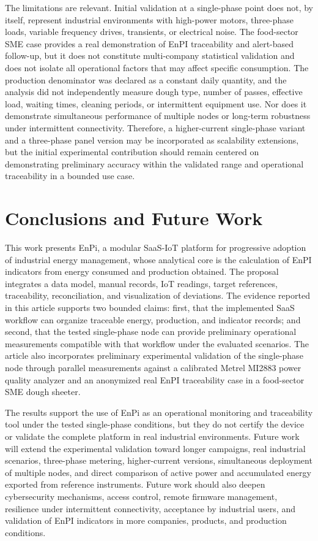 \documentclass{ieeeaccess}
\begin{document}
The limitations are relevant. Initial validation at a single-phase point does not, by itself, represent industrial environments with high-power motors, three-phase loads, variable frequency drives, transients, or electrical noise. The food-sector SME case provides a real demonstration of EnPI traceability and alert-based follow-up, but it does not constitute multi-company statistical validation and does not isolate all operational factors that may affect specific consumption. The production denominator was declared as a constant daily quantity, and the analysis did not independently measure dough type, number of passes, effective load, waiting times, cleaning periods, or intermittent equipment use. Nor does it demonstrate simultaneous performance of multiple nodes or long-term robustness under intermittent connectivity. Therefore, a higher-current single-phase variant and a three-phase panel version may be incorporated as scalability extensions, but the initial experimental contribution should remain centered on demonstrating preliminary accuracy within the validated range and operational traceability in a bounded use case.

\section{Conclusions and Future Work}
\label{sec:conclusions}

This work presents EnPi, a modular SaaS-IoT platform for progressive adoption of industrial energy management, whose analytical core is the calculation of EnPI indicators from energy consumed and production obtained. The proposal integrates a data model, manual records, IoT readings, target references, traceability, reconciliation, and visualization of deviations. The evidence reported in this article supports two bounded claims: first, that the implemented SaaS workflow can organize traceable energy, production, and indicator records; and second, that the tested single-phase node can provide preliminary operational measurements compatible with that workflow under the evaluated scenarios. The article also incorporates preliminary experimental validation of the single-phase node through parallel measurements against a calibrated Metrel MI2883 power quality analyzer and an anonymized real EnPI traceability case in a food-sector SME dough sheeter.

The results support the use of EnPi as an operational monitoring and traceability tool under the tested single-phase conditions, but they do not certify the device or validate the complete platform in real industrial environments. Future work will extend the experimental validation toward longer campaigns, real industrial scenarios, three-phase metering, higher-current versions, simultaneous deployment of multiple nodes, and direct comparison of active power and accumulated energy exported from reference instruments. Future work should also deepen cybersecurity mechanisms, access control, remote firmware management, resilience under intermittent connectivity, acceptance by industrial users, and validation of EnPI indicators in more companies, products, and production conditions.
\end{document}
